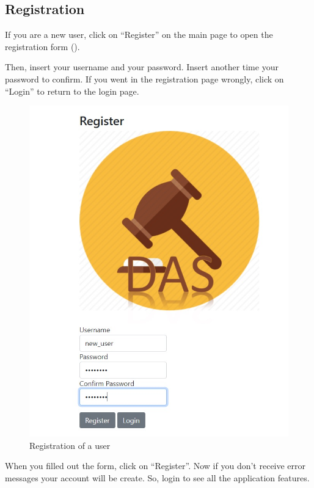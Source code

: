 \subsection{Registration}\label{subsec:manualregister}

If you are a new user, click on ``Register'' on the main page to open the
registration form ().

Then, insert your username and your password. Insert another time your password
to confirm. If you went in the registration page wrongly, click on ``Login'' to
return to the login page.

\begin{figure}[htb]
	\centering
	\includegraphics[width=\textwidth]{img/registration.jpg}
	\caption{Registration of a user}\label{fig:registration}
\end{figure}

When you filled out the form, click on ``Register''. Now if you don’t receive
error messages your account will be create. So, login to see all the application
features.
